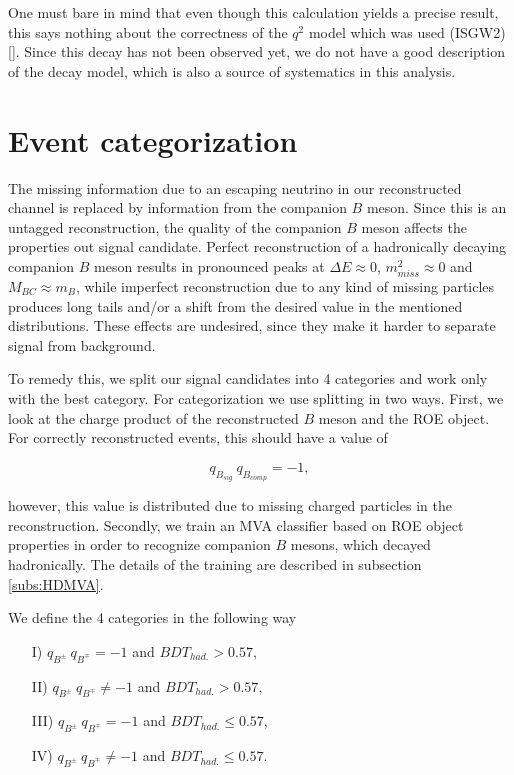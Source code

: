 \documentclass[oneside,a4paper,openany,12pt]{scrbook}
\begin{document}
One must bare in mind that even though this calculation yields a precise result, this says nothing about the correctness of the $q^2$ model which was used (ISGW2) []. Since this decay has not been observed yet, we do not have a good description of the decay model, which is also a source of systematics in this analysis.

\section{Event categorization}\label{sec:event-categorization}

The missing information due to an escaping neutrino in our reconstructed channel is replaced by information from the companion $B$ meson. Since this is an untagged reconstruction, the quality of the companion $B$ meson affects the properties out signal candidate. Perfect reconstruction of a hadronically decaying companion $B$ meson results in pronounced peaks at $\Delta E \approx 0$, $m_{miss}^2 \approx 0$ and $M_{BC} \approx m_B$, while imperfect reconstruction due to any kind of missing particles produces long tails and/or a shift from the desired value in the mentioned distributions. These effects are undesired, since they make it harder to separate signal from background.

To remedy this, we split our signal candidates into 4 categories and work only with the best category. For categorization we use splitting in two ways. First, we look at the charge product of the reconstructed $B$ meson and the ROE object. For correctly reconstructed events, this should have a value of 

\begin{equation}
\label{eq:chargeprod}
q_{B_{sig}}~q_{B_{comp}} = -1,
\end{equation}

however, this value is distributed due to missing charged particles in the reconstruction. Secondly, we train an MVA classifier based on ROE object properties in order to recognize companion $B$ mesons, which decayed hadronically. The details of the training are described in subsection \ref{subs:HDMVA}.

We define the 4 categories in the following way
\begin{enumerate} 
\item[I)] $q_{B^\pm}~q_{B^\mp} = -1$ and $BDT_{had.} > 0.57$,
\item[II)] $q_{B^\pm}~q_{B^\mp} \neq -1$ and $BDT_{had.} > 0.57$,
\item[III)] $q_{B^\pm}~q_{B^\mp} = -1$ and $BDT_{had.} \leq 0.57$,
\item[IV)] $q_{B^\pm}~q_{B^\mp} \neq -1$ and $BDT_{had.} \leq 0.57$.
\end{enumerate}
\end{document}
